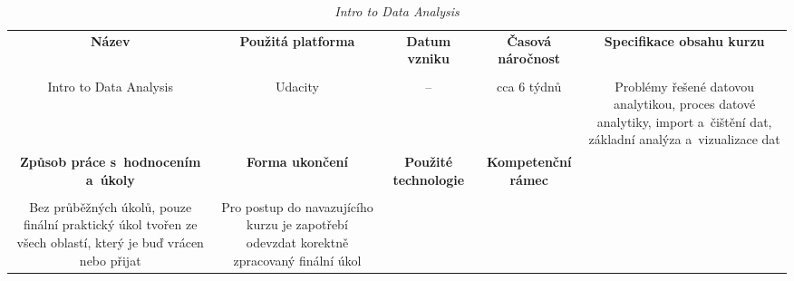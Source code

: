 \begin{landscape}

\begin{table}[htbp]

\renewcommand\thetable{2}

\caption{\textit{Intro to Data Analysis}}\label{tab2}

\footnotesize

{

\justifying

\begin{tabularx}{\linewidth}{CCCCC}

\toprule

\textbf{Název} &

\textbf{Použitá platforma} &

\textbf{Datum vzniku} &

\textbf{Časová náročnost} &
 
\textbf{Specifikace obsahu kurzu}

\\

\tabularnewline
\midrule

Intro to Data Analysis

&

Udacity

&

–

&

cca 6 týdnů

&

Problémy řešené datovou analytikou, proces datové analytiky, import a~čištění dat, základní analýza a~vizualizace dat

\\
\toprule

\textbf{Způsob práce s~hodnocením a~úkoly} &

\textbf{Forma ukončení} &

\textbf{Použité technologie} &

\textbf{Kompetenční rámec} 

\\

\tabularnewline
\midrule

Bez průběžných úkolů, pouze finální praktický úkol tvořen ze všech oblastí, který je buď vrácen nebo přijat

&

Pro postup do navazujícího kurzu je zapotřebí odevzdat korektně zpracovaný finální úkol

&


\end{tabularx}}
\end{table}
\end{landscape}

